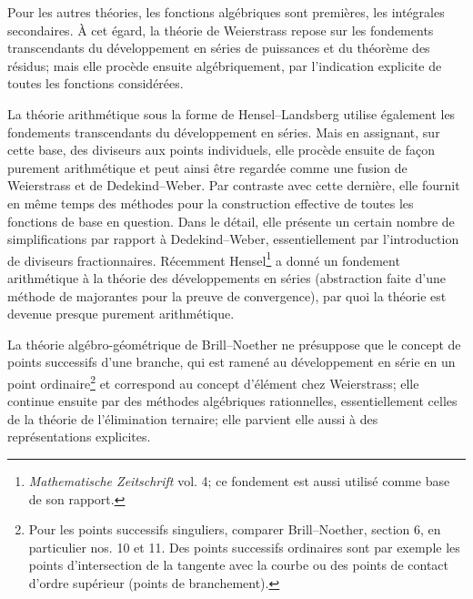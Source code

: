 Pour les autres théories, les fonctions algébriques sont premières, les intégrales secondaires. À cet égard, la théorie de Weierstrass repose sur les fondements transcendants du développement en séries de puissances et du théorème des résidus; mais elle procède ensuite algébriquement, par l'indication explicite de toutes les fonctions considérées.

La théorie arithmétique sous la forme de Hensel--Landsberg utilise également les fondements transcendants du développement en séries. Mais en assignant, sur cette base, des diviseurs aux points individuels, elle procède ensuite de façon purement arithmétique et peut ainsi être regardée comme une fusion de Weierstrass et de Dedekind--Weber. Par contraste avec cette dernière, elle fournit en même temps des méthodes pour la construction effective de toutes les fonctions de base en question. Dans le détail, elle présente un certain nombre de simplifications par rapport à Dedekind--Weber, essentiellement par l'introduction de diviseurs \og{}fractionnaires\fg{}. Récemment Hensel\footnote{\emph{Mathematische Zeitschrift} vol. 4; ce fondement est aussi utilisé comme base de son rapport.} a donné un fondement arithmétique à la théorie des développements en séries (abstraction faite d'une méthode de majorantes pour la preuve de convergence), par quoi la théorie est devenue presque purement arithmétique.

La théorie algébro-géométrique de Brill--Noether ne présuppose que le concept de \og{}points successifs\fg{} d'une branche, qui est ramené au développement en série en un point ordinaire\footnote{Pour les points successifs \og{}singuliers\fg{}, comparer Brill--Noether, section 6, en particulier nos. 10 et 11. Des points successifs ordinaires sont par exemple les points d'intersection de la tangente avec la courbe ou des points de contact d'ordre supérieur (points de branchement).} et correspond au concept d'élément chez Weierstrass; elle continue ensuite par des méthodes algébriques rationnelles, essentiellement celles de la théorie de l'élimination ternaire; elle parvient elle aussi à des représentations explicites.

